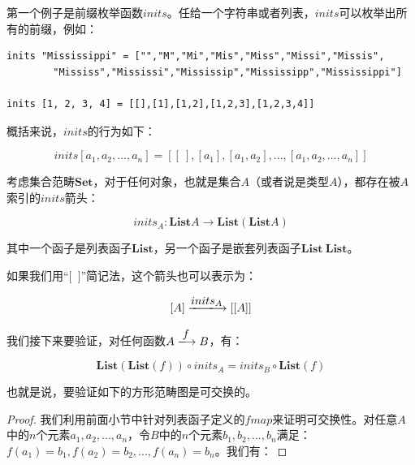 \documentclass[b5paper]{ctexart}
\begin{document}
\begin{example}
第一个例子是前缀枚举函数$inits$。任给一个字符串或者列表，$inits$可以枚举出所有的前缀，例如：

\lstset{frame=none}
\begin{lstlisting}
inits "Mississippi" = ["","M","Mi","Mis","Miss","Missi","Missis",
        "Mississ","Mississi","Mississip","Mississipp","Mississippi"]

inits [1, 2, 3, 4] = [[],[1],[1,2],[1,2,3],[1,2,3,4]]
\end{lstlisting}

概括来说，$inits$的行为如下：

\[
inits [a_1, a_2, ..., a_n] = [[\ ], [a_1], [a_1, a_2], ..., [a_1, a_2, ..., a_n]]
\]

考虑集合范畴$\pmb{Set}$，对于任何对象，也就是集合$A$（或者说是类型$A$），都存在被$A$索引的$inits$箭头：

\[
inits_A : \mathbf{List} A \to \mathbf{List}(\mathbf{List} A)
\]

其中一个函子是列表函子$\mathbf{List}$，另一个函子是嵌套列表函子$\mathbf{List}\ \mathbf{List}$。

如果我们用“[\ ]”简记法，这个箭头也可以表示为：

\[
[A] \arrowto{inits_A} [[A]]
\]

我们接下来要验证，对任何函数$A \arrowto{f} B$，有：

\[
\mathbf{List}(\mathbf{List}(f)) \circ inits_A = inits_B \circ \mathbf{List}(f)
\]

也就是说，要验证如下的方形范畴图是可交换的。

\begin{center}
\end{center}

\begin{proof}
我们利用前面小节中针对列表函子定义的$fmap$来证明可交换性。对任意$A$中的$n$个元素$a_1, a_2, ..., a_n$，令$B$中的$n$个元素$b_1, b_2, ..., b_n$满足：$f(a_1) = b_1, f(a_2) = b_2, ..., f(a_n) = b_n$。我们有：


\end{proof}
\end{example}
\end{document}
